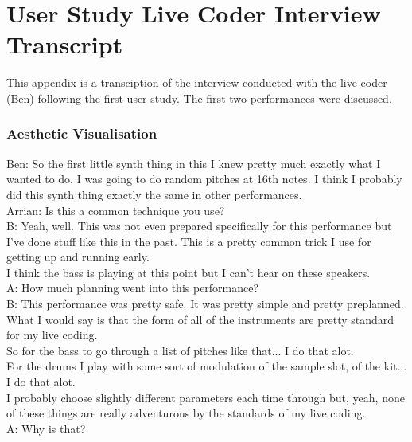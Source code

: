 \chapter{User Study Live Coder Interview Transcript}

This appendix is a transciption of the interview conducted with the live coder (Ben) following the first user study. The first two performances were discussed.


\subsection*{Aesthetic Visualisation}

Ben: So the first little synth thing in this I knew pretty much exactly what I wanted to do. I was going to do random pitches at 16th notes. I think I probably did this synth thing exactly the same in other performances.\\

Arrian: Is this a common technique you use?\\

B: Yeah, well. This was not even prepared specifically for this performance but I've done stuff like this in the past. This is a pretty common trick I use for getting up and running early.\\

I think the bass is playing at this point but I can't hear on these speakers.\\

A: How much planning went into this performance?\\

B: This performance was pretty safe. It was pretty simple and pretty preplanned. What I would say is that the form of all of the instruments are pretty standard for my live coding.\\

So for the bass to go through a list of pitches like that... I do that alot.\\

For the drums I play with some sort of modulation of the sample slot, of the kit... I do that alot.\\

I probably choose slightly different parameters each time through but, yeah, none of these things are really adventurous by the standards of my live coding.\\

A: Why is that?\\

